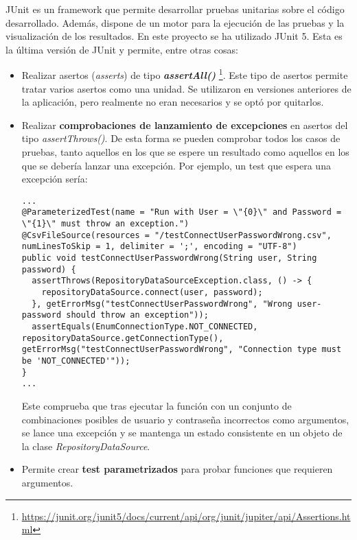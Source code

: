 JUnit es un framework que permite desarrollar pruebas unitarias sobre el código desarrollado. Además, dispone de un motor para la ejecución de las pruebas y la visualización de los resultados. En este proyecto se ha utilizado JUnit 5. Esta es la última versión de JUnit y permite, entre otras cosas:
\begin{itemize}
	\item Realizar asertos (\textit{asserts}) de tipo \textit{\textbf{assertAll()}} \footnote{\url{https://junit.org/junit5/docs/current/api/org/junit/jupiter/api/Assertions.html}}. Este tipo de asertos permite tratar varios asertos como una unidad. Se utilizaron en versiones anteriores de la aplicación, pero realmente no eran necesarios y se optó por quitarlos.
	
	\item Realizar \textbf{comprobaciones de lanzamiento de excepciones} en asertos del tipo \textit{assertThrows()}. De esta forma se pueden comprobar todos los casos de pruebas, tanto aquellos en los que se espere un resultado como aquellos en los que se debería lanzar una excepción. Por ejemplo, un test que espera una excepción sería:\\
\begin{minipage}{\linewidth}
{\tiny
\begin{lstlisting}[breaklines]
...
@ParameterizedTest(name = "Run with User = \"{0}\" and Password = \"{1}\" must throw an exception.")
@CsvFileSource(resources = "/testConnectUserPasswordWrong.csv", numLinesToSkip = 1, delimiter = ';', encoding = "UTF-8")
public void testConnectUserPasswordWrong(String user, String password) {
  assertThrows(RepositoryDataSourceException.class, () -> {
	repositoryDataSource.connect(user, password);
  }, getErrorMsg("testConnectUserPasswordWrong", "Wrong user-password should throw an exception"));
  assertEquals(EnumConnectionType.NOT_CONNECTED, repositoryDataSource.getConnectionType(), getErrorMsg("testConnectUserPasswordWrong", "Connection type must be 'NOT_CONNECTED'"));
}
...		
\end{lstlisting}
}
\end{minipage}
	
	Este comprueba que tras ejecutar la función con un conjunto de combinaciones posibles de usuario y contraseña incorrectos como argumentos, se lance una excepción y se mantenga un estado consistente en un objeto de la clase \textit{RepositoryDataSource}.
	
	\item Permite crear \textbf{test parametrizados} para probar funciones que requieren argumentos.
	

\end{itemize}
